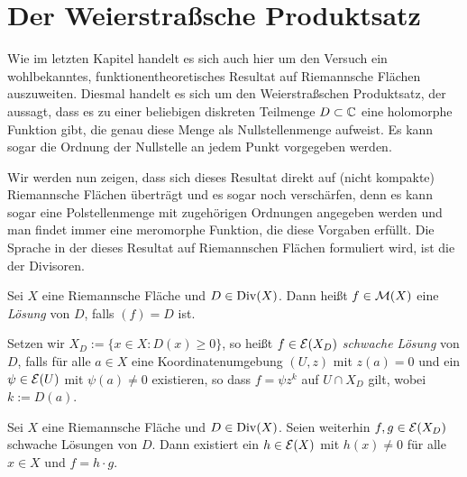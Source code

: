 
\section{Der Weierstraßsche Produktsatz}
\label{sec:Weierstrass}

Wie im letzten Kapitel handelt es sich auch hier um den Versuch ein
wohlbekanntes, funktionentheoretisches Resultat auf Riemannsche
Flächen auszuweiten. Diesmal handelt es sich um den
Weierstraßschen Produktsatz, der aussagt, dass es zu einer beliebigen
diskreten Teilmenge $D \subset \mathbb{C}$ eine holomorphe Funktion gibt, die
genau diese Menge als Nullstellenmenge aufweist. Es kann sogar die
Ordnung der Nullstelle an jedem Punkt vorgegeben werden.

Wir werden nun zeigen, dass sich dieses Resultat direkt auf (nicht
kompakte) Riemannsche Flächen überträgt und es sogar noch verschärfen,
denn es kann sogar eine Polstellenmenge mit zugehörigen Ordnungen
angegeben werden und man findet immer eine meromorphe Funktion, die
diese Vorgaben erfüllt. Die Sprache in der dieses Resultat auf
Riemannschen Flächen formuliert wird, ist die der Divisoren.

\begin{defin}
  \label{def:divisor-lsg}
  Sei $X$ eine Riemannsche Fläche und $D \in \operatorname{Div}(X)$. Dann heißt $f
  \in \mathcal{M}(X)$ eine \emph{Lösung} von $D$, falls $(f) = D$ ist.
  
  Setzen wir $X_D := \{x \in X: D(x) \geq 0 \}$, so heißt $f \in
  \mathcal{E}(X_D)$ \emph{schwache Lösung} von $D$, falls für alle $a \in X$
  eine Koordinatenumgebung $(U,z)$ mit $z(a) = 0$ und ein $\psi \in
  \mathcal{E}(U)$ mit $\psi(a) \neq 0$ existieren, so dass $f = \psi z^k$
  auf $ U \cap X_D$ gilt, wobei $k := D(a)$.
\end{defin}

\begin{lemma}
  Sei $X$ eine Riemannsche Fläche und $D \in \operatorname{Div}(X)$. Seien weiterhin
  $f,g \in \mathcal{E}(X_D)$ schwache Lösungen von $D$. Dann existiert ein
  $h \in \mathcal{E}(X)$ mit $h(x) \neq 0$ für alle $x \in X$ und $ f
  = h\cdot g$.
\end{lemma}

